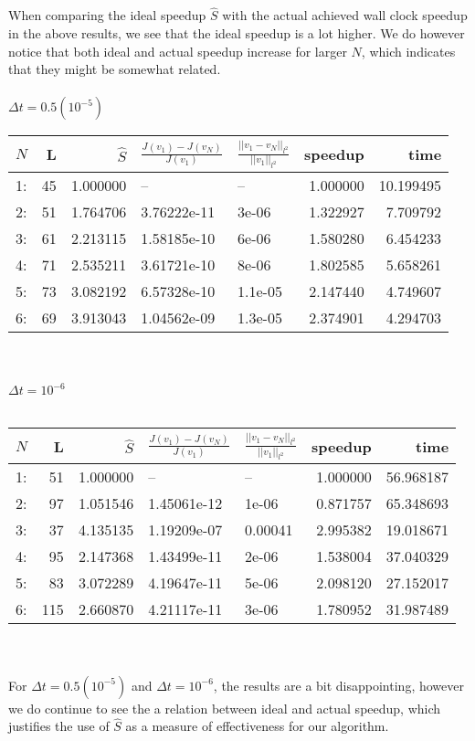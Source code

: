 \\
\\
When comparing the ideal speedup $\hat S$ with the actual achieved wall clock speedup in the above results, we see that the ideal speedup is a lot higher. We do however notice that both ideal and actual speedup increase for larger $N$, which indicates that they might be somewhat related.
\\
\\
$\Delta t = 0.5(10^{-5})$
\\
\begin{tabular}{lrrllrr}
\toprule
{} $N$&   L &        $\hat S$ &         $\frac{J(v_1)-J(v_N)}{J(v_1)}$ &    $\frac{||v_1-v_N||_{l^2}}{||v_1||_{l^2}}$&speedup &       time \\
\midrule
1:  &  45 &  1.000000 &           -- &       -- &  1.000000 &  10.199495 \\
2: &  51 &  1.764706 &  3.76222e-11 &    3e-06 &  1.322927 &   7.709792 \\
3: &  61 &  2.213115 &  1.58185e-10 &    6e-06 &  1.580280 &   6.454233 \\
4: &  71 &  2.535211 &  3.61721e-10 &    8e-06 &  1.802585 &   5.658261 \\
5: &  73 &  3.082192 &  6.57328e-10 &  1.1e-05 &  2.147440 &   4.749607 \\
6: &  69 &  3.913043 &  1.04562e-09 &  1.3e-05 &  2.374901 &   4.294703 \\
\bottomrule
\end{tabular}
\\
\\
$\Delta t = 10^{-6}$
\\
\\
\begin{tabular}{lrrllrr}
\toprule
{} $N$&   L &        $\hat S$ &          $\frac{J(v_1)-J(v_N)}{J(v_1)}$ &    $\frac{||v_1-v_N||_{l^2}}{||v_1||_{l^2}}$&speedup &       time \\
\midrule
1:  &   51 &  1.000000 &           -- &       -- &  1.000000 &  56.968187 \\
2: &   97 &  1.051546 &  1.45061e-12 &    1e-06 &  0.871757 &  65.348693 \\
3: &   37 &  4.135135 &  1.19209e-07 &  0.00041 &  2.995382 &  19.018671 \\
4: &   95 &  2.147368 &  1.43499e-11 &    2e-06 &  1.538004 &  37.040329 \\
5: &   83 &  3.072289 &  4.19647e-11 &    5e-06 &  2.098120 &  27.152017 \\
6: &  115 &  2.660870 &  4.21117e-11 &    3e-06 &  1.780952 &  31.987489 \\
\bottomrule
\end{tabular}
\\
\\
For $\Delta t = 0.5(10^{-5})$ and $\Delta t = 10^{-6}$, the results are a bit disappointing, however we do continue to see the a relation between ideal and actual speedup, which justifies the use of $\hat S$ as a measure of effectiveness for our algorithm. 